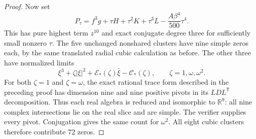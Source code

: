 \documentclass[UTF8,11pt]{ctexart}
\theoremstyle{definition}
\numberwithin{equation}{section}
\begin{document}
\begin{proof}
Now set
\begin{equation}\label{v38:eq:family}
 P_\tau=f^3g+\tau H+\tau^2K+\tau^3L
                   -\frac{A\beta^4}{500}\tau^4.
\end{equation}
This has pure highest term $z^{10}$ and exact conjugate degree
three for sufficiently small nonzero $\tau$.
The five unchanged nonshared clusters have nine simple zeros
each, by the same translated radial cubic calculation as before.
The other three have normalized limits
\begin{equation}\label{v38:eq:cubic}
 \xi^3+\zeta|\xi|^2+
          \mathcal E_*(\zeta)\bar\xi-\mathcal C_*(\zeta),
 \qquad \zeta=1,\omega,\omega^2.
\end{equation}
For both $\zeta=1$ and $\zeta=\omega$, the exact rational
trace form described in the preceding proof has dimension nine
and nine positive pivots in its $LDL^{\mathsf T}$ decomposition.
Thus each real algebra is reduced and isomorphic to
$\mathbb R^9$: all nine complex intersections lie on the real
slice and are simple. The verifier supplies every pivot.
Conjugation gives the same count for $\omega^2$.
All eight cubic clusters therefore contribute $72$ zeros.


\end{proof}
\end{document}
